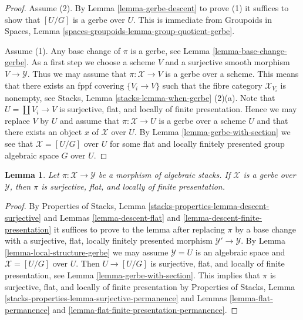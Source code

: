 \documentclass{stacks-project}
\theoremstyle{plain}
\newtheorem{lemma}[subsection]{Lemma}
\theoremstyle{definition}
\theoremstyle{remark}
\numberwithin{equation}{subsection}
\begin{document}
\begin{proof}
Assume (2). By
Lemma \ref{lemma-gerbe-descent}
to prove (1) it suffices to show that $[U/G]$ is a gerbe over $U$.
This is immediate from
Groupoids in Spaces, Lemma \ref{spaces-groupoids-lemma-group-quotient-gerbe}.

\medskip\noindent
Assume (1). Any base change of $\pi$ is a gerbe, see
Lemma \ref{lemma-base-change-gerbe}.
As a first step we choose a scheme $V$ and a surjective smooth morphism
$V \to \mathcal{Y}$. Thus we may assume that $\pi : \mathcal{X} \to V$
is a gerbe over a scheme. This means that there exists an
fppf covering $\{V_i \to V\}$ such that the fibre category
$\mathcal{X}_{V_i}$ is nonempty, see
Stacks, Lemma \ref{stacks-lemma-when-gerbe} (2)(a).
Note that $U = \coprod V_i \to V$ is surjective, flat, and
locally of finite presentation. Hence we may replace $V$ by $U$ and
assume that $\pi : \mathcal{X} \to U$ is a gerbe over a scheme $U$ and
that there exists an object $x$ of $\mathcal{X}$ over $U$. By
Lemma \ref{lemma-gerbe-with-section}
we see that $\mathcal{X} = [U/G]$ over $U$ for some flat
and locally finitely presented group algebraic space $G$ over $U$.
\end{proof}

\begin{lemma}
\label{lemma-gerbe-fppf}
Let $\pi : \mathcal{X} \to \mathcal{Y}$ be a morphism of algebraic stacks.
If $\mathcal{X}$ is a gerbe over $\mathcal{Y}$, then $\pi$ is surjective,
flat, and locally of finite presentation.
\end{lemma}

\begin{proof}
By
Properties of Stacks, Lemma
\ref{stacks-properties-lemma-descent-surjective}
and
Lemmas \ref{lemma-descent-flat} and
\ref{lemma-descent-finite-presentation}
it suffices to prove to the lemma after replacing $\pi$ by a base change
with a surjective, flat, locally finitely presented morphism
$\mathcal{Y}' \to \mathcal{Y}$. By
Lemma \ref{lemma-local-structure-gerbe}
we may assume $\mathcal{Y} = U$ is an algebraic space and
$\mathcal{X} = [U/G]$ over $U$.
Then $U \to [U/G]$ is surjective, flat, and
locally of finite presentation, see
Lemma \ref{lemma-gerbe-with-section}.
This implies that $\pi$ is surjective, flat, and locally
of finite presentation by
Properties of Stacks,
Lemma \ref{stacks-properties-lemma-surjective-permanence}
and
Lemmas \ref{lemma-flat-permanence} and
\ref{lemma-flat-finite-presentation-permanence}.
\end{proof}
\end{document}
